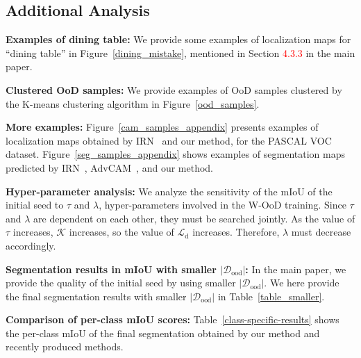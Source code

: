 \documentclass[10pt,twocolumn,letterpaper]{article}
\begin{document}
\subsection{Additional Analysis}
\textbf{Examples of dining table:} We provide some examples of localization maps for ``dining table'' in Figure~\ref{dining_mistake},  mentioned in Section \textcolor{red}{4.3.3} in the main paper.

\textbf{Clustered OoD samples:} We provide examples of OoD samples clustered by the K-means clustering algorithm in Figure~\ref{ood_samples}.

\textbf{More examples:} Figure~\ref{cam_samples_appendix} presents examples of localization maps obtained by IRN~\cite{ahn2019weakly} and our method, for the PASCAL VOC dataset.
Figure~\ref{seg_samples_appendix} shows examples of segmentation maps predicted by IRN~\cite{ahn2019weakly}, AdvCAM~\cite{lee2021anti}, and our method.


\textbf{Hyper-parameter analysis:} We analyze the sensitivity of the mIoU of the initial seed to $\tau$ and $\lambda$, hyper-parameters involved in the W-OoD training.
Since $\tau$ and $\lambda$ are dependent on each other, they must be searched jointly.
As the value of $\tau$ increases, $\mathcal{K}$ increases, so the value of $\mathcal{L}_\text{d}$ increases. Therefore, $\lambda$ must decrease accordingly.


\textbf{Segmentation results in mIoU with smaller $|\mathcal{D}_\text{ood}|$:}
In the main paper, we provide the quality of the initial seed by using smaller $|\mathcal{D}_\text{ood}|$. We here provide the final segmentation results with smaller $|\mathcal{D}_\text{ood}|$ in Table~\ref{table_smaller}.

\textbf{Comparison of per-class mIoU scores:}
Table~\ref{class-specific-results} shows the per-class mIoU of the final segmentation obtained by our method and recently produced methods.
\end{document}
